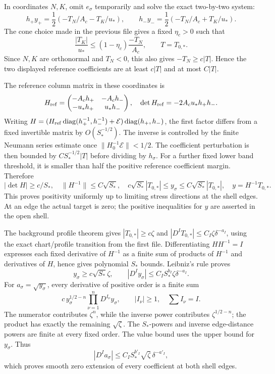 \documentclass[10pt,a4paper]{article}
\begin{document}
In coordinates \(N,K\), omit \(e_\sigma\) temporarily and solve the exact two-by-two system: \[
h_+y_+=\frac12(-T_N/A_c-T_K/u_*),\qquad
h_-y_-=\frac12(-T_N/A_c+T_K/u_*).
\] The cone choice made in the previous file gives a fixed \(\eta_c>0\) such that \[
\frac{|T_K|}{u_*}\le(1-\eta_c)\frac{-T_N}{A_c},
\qquad T=T_{0,*}.
\] Since \(N,K\) are orthonormal and \(T_N<0\), this also gives \(-T_N\ge c|T|\). Hence the two displayed reference coefficients are at least \(c|T|\) and at most \(C|T|\).

The reference column matrix in these coordinates is \[
H_{\rm ref}=
\begin{pmatrix}-A_ch_+&-A_ch_-\\-u_*h_+&u_*h_-\end{pmatrix},
\quad
\det H_{\rm ref}=-2A_cu_*h_+h_-.
\] Writing \(H=(H_{\rm ref}\operatorname{diag}(h_+^{-1},h_-^{-1})+
\mathcal E)\operatorname{diag}(h_+,h_-)\), the first factor differs from a fixed invertible matrix by \(O(S_*^{-1/2})\). The inverse is controlled by the finite Neumann series estimate once \(\|H_0^{-1}\mathcal E\|<1/2\). The coefficient perturbation is then bounded by \(CS_*^{-1/2}|T|\) before dividing by \(h_\sigma\). For a further fixed lower band threshold, it is smaller than half the positive reference coefficient margin. Therefore \[
|\det H|\ge c/S_*,\quad \|H^{-1}\|\le C\sqrt{S_*},\quad
c\sqrt{S_*}|T_{0,*}|\le y_\sigma\le C\sqrt{S_*}|T_{0,*}|,
\quad y=H^{-1}T_{0,*}.
\] This proves positivity uniformly up to limiting stress directions at the shell edges. At an edge the actual target is zero; the positive inequalities for \(y\) are asserted in the open shell.

The background profile theorem gives \(|T_{0,*}|\ge c\zeta\) and \(|D^IT_{0,*}|\le C_I\zeta\delta^{-a_I}\), using the exact chart/profile transition from the first file. Differentiating \(HH^{-1}=I\) expresses each fixed derivative of \(H^{-1}\) as a finite sum of products of \(H^{-1}\) and derivatives of \(H\), hence gives polynomial \(S_*\) bounds. Leibniz's rule proves \[
y_\sigma\ge c\sqrt{S_*}\zeta,\qquad
|D^Iy_\sigma|\le C_IS_*^{b_I}\zeta\delta^{-a_I}.
\] For \(a_\sigma=\sqrt{y_\sigma}\), every derivative of positive order is a finite sum \[
c\,y_\sigma^{1/2-n}\prod_{\nu=1}^nD^{I_\nu}y_\sigma,
\qquad |I_\nu|\ge1,\quad \sum I_\nu=I.
\] The numerator contributes \(\zeta^n\), while the inverse power contributes \(\zeta^{1/2-n}\); the product has exactly the remaining \(\sqrt\zeta\). The \(S_*\)-powers and inverse edge-distance powers are finite at every fixed order. The value bound uses the upper bound for \(y_\sigma\). Thus \[
|D^Ia_\sigma|\le C_IS_*^{b'_I}\sqrt\zeta\,\delta^{-a'_I},
\] which proves smooth zero extension of every coefficient at both shell edges.
\end{document}
